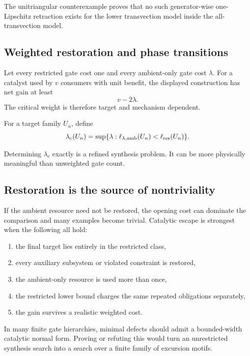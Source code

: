 The unitriangular counterexample proves that no such generator-wise one-Lipschitz retraction exists for the lower transvection model inside the all-transvection model.

\subsection{Weighted restoration and phase transitions}
Let every restricted gate cost one and every ambient-only gate cost $\lambda$.  For a catalyst used by $v$ consumers with unit benefit, the displayed construction has net gain at least
\[
v-2\lambda.
\]
The critical weight is therefore target and mechanism dependent.

\begin{definition}
For a target family $U_n$, define
\[
\lambda_c(U_n)
=
\sup\{\lambda:\ell_{\lambda,\mathrm{amb}}(U_n)<\ell_{\mathrm{res}}(U_n)\}.
\]
\end{definition}
Determining $\lambda_c$ exactly is a refined synthesis problem.  It can be more physically meaningful than unweighted gate count.

\subsection{Restoration is the source of nontriviality}
If the ambient resource need not be restored, the opening cost can dominate the comparison and many examples become trivial.  Catalytic escape is strongest when the following all hold:
\begin{enumerate}
\item the final target lies entirely in the restricted class,
\item every auxiliary subsystem or violated constraint is restored,
\item the ambient-only resource is used more than once,
\item the restricted lower bound charges the same repeated obligations separately,
\item the gain survives a realistic weighted cost.
\end{enumerate}

\begin{conjecturebox}
In many finite gate hierarchies, minimal defects should admit a bounded-width catalytic normal form.  Proving or refuting this would turn an unrestricted synthesis search into a search over a finite family of excursion motifs.
\end{conjecturebox}

